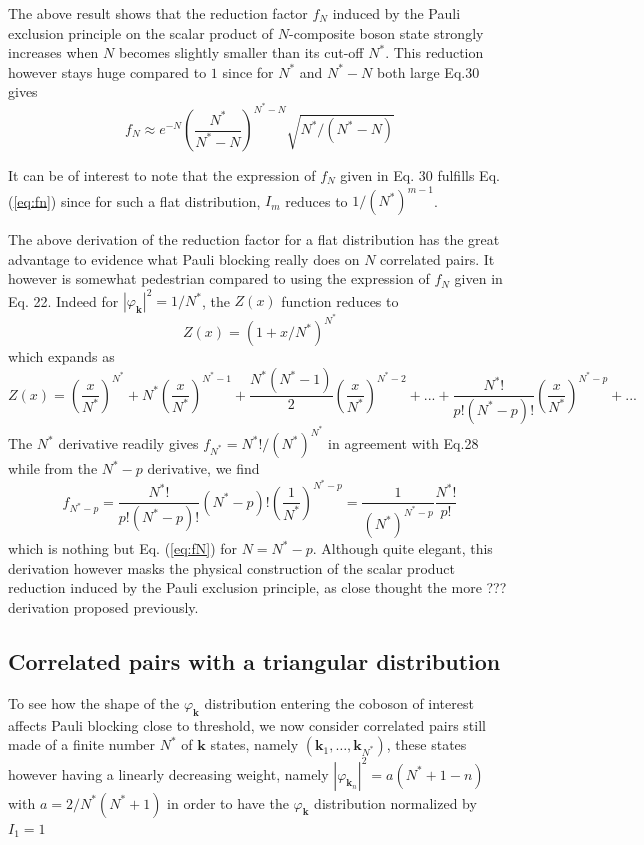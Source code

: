\documentclass[aps,prb,preprint,groupedaddress,amsmath]{revtex4}
\newcommand{\vk}{\ensuremath{\mathbf{k}}}
\begin{document}
 The above result shows that the reduction factor $f_N$ induced by the Pauli exclusion principle on the scalar product of $N$-composite boson state strongly increases when $N$ becomes slightly smaller than its cut-off  $N^*$. This reduction however stays huge compared to $1$ since for $N^*$ and $N^*-N$ both large Eq.30 gives
  \begin{equation}
f_{N}\approx{}e^{-N}(\frac{N^*}{N^*-N{}})^{N^*-N}\sqrt{{N^*/(N^*-N)}}
\end{equation}


It can be of interest to note that the expression of $f_N$ given in Eq. 30 fulfills Eq. (\ref{eq:fn}) since for such a flat distribution, $I_m$ reduces to $1/(N^*)^{m-1}$.

The above derivation of the reduction factor for a flat distribution has the great advantage to evidence what Pauli blocking really does on $N$ correlated pairs. It however is somewhat pedestrian compared to using the expression of $f_N$ given in Eq. 22. Indeed for $|\varphi_\vk|^2=1/N^*$, the $Z(x)$ function reduces to 
\begin{equation}
Z(x)=(1+x/N^*)^{N^*}
\end{equation}
which expands as
\begin{equation}
Z(x)=(\frac{x}{N^*})^{N^*}+N^*(\frac{x}{N^*})^{N^*-1}+\frac{N^*(N^*-1)}{2}(\frac{x}{N^*})^{N^*-2}+...+\frac{N^*!}{p!(N^*-p)!}(\frac{x}{N^*})^{N^*-p}+...
\end{equation}
The $N^*$ derivative readily gives $f_{N^*}=N^*!/(N^*)^{N^*}$ in agreement with Eq.28 while from the $N^*-p$ derivative, we find
\begin{equation}
f_{N^*-p}=\frac{N^*!}{p!(N^*-p)!}(N^*-p)!(\frac{1}{N^*})^{N^*-p}
=\frac{1}{(N^*)^{N^*-p}}\frac{N^*!}{p!}
\end{equation}
which is nothing but Eq. (\ref{eq:fN}) for $N=N^*-p$. Although quite elegant, this derivation however masks the physical construction of the scalar product reduction induced by the Pauli exclusion principle, as close thought the more ??? derivation proposed previously.






\subsection{Correlated pairs with a triangular distribution}
To see how the shape of the $\varphi_{\vk}$ distribution entering the coboson of interest affects Pauli blocking close to threshold, we now consider correlated pairs still made of a finite number $N^*$ of $\vk$ states, namely $(\vk_1,\dots,\vk_{N^*})$, these states however having a linearly decreasing weight, namely $|\varphi_{\vk_n}|^2=a(N^*+1-n)$ with $a=2/N^*(N^*+1)$ in order to have the $\varphi_{\vk}$ distribution normalized by $I_1=1$
\end{document}
